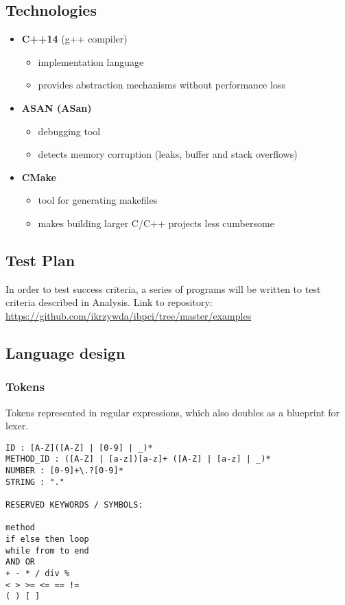 \documentclass[12pt]{article}
\begin{document}
\subsection*{Technologies}
\begin{itemize}
    \item \textbf{C++14} (g++ compiler)
        \begin{itemize}
            \item implementation language
            \item provides abstraction mechanisms without performance loss
        \end{itemize}
    \item \textbf{ASAN (ASan)} 
        \begin{itemize}
            \item debugging tool
            \item detects memory corruption (leaks, buffer and stack overflows)
        \end{itemize}
    \item \textbf{CMake}
        \begin{itemize}
            \item tool for generating makefiles 
            \item makes building larger C/C++ projects less cumbersome
        \end{itemize}
\end{itemize}
\subsection*{Test Plan}
In order to test success criteria, a series of programs will be written to test criteria
described in Analysis. Link to repository: \url{https://github.com/ikrzywda/ibpci/tree/master/examples}
\subsection*{Language design}
\subsubsection*{Tokens}
Tokens represented in regular expressions, which also doubles as a blueprint for lexer.
\begin{verbatim}
ID : [A-Z]([A-Z] | [0-9] | _)*
METHOD_ID : ([A-Z] | [a-z])[a-z]+ ([A-Z] | [a-z] | _)*
NUMBER : [0-9]+\.?[0-9]*
STRING : "."

RESERVED KEYWORDS / SYMBOLS:

method
if else then loop
while from to end
AND OR
+ - * / div %
< > >= <= == !=
( ) [ ]
\end{verbatim}
\end{document}
